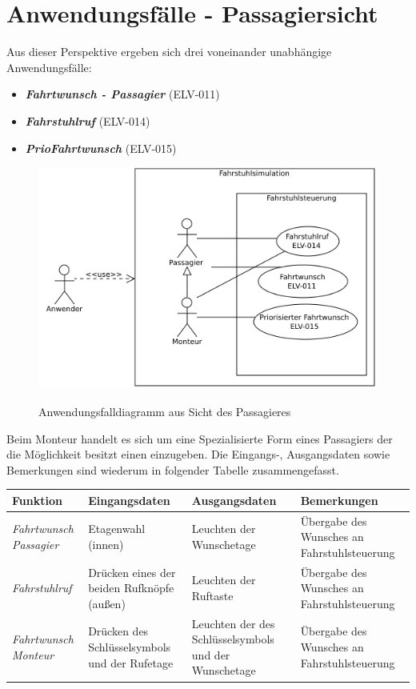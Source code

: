 \section{Anwendungsfälle - Passagiersicht}
Aus dieser Perspektive ergeben sich drei voneinander unabhängige Anwendungsfälle:

\begin{itemize}
	\item \textit{\textbf{\gls{Fahrtwunsch} - Passagier}} (ELV-011)
	\item \textit{\textbf{\gls{Fahrstuhlruf} }} (ELV-014)
	\item \textit{\textbf{\gls{PrioFahrtwunsch}}} (ELV-015)
\end{itemize}


\begin{figure}[hbt]
	\includegraphics[width=\textwidth]{images/passagierAWF.png}
	\label{fig:passagierAWF}
	\caption{Anwendungsfalldiagramm aus Sicht des Passagieres}
\end{figure}
Beim \gls{Monteur} handelt es sich um eine Spezialisierte Form eines \gls{Passagier}s der die Möglichkeit besitzt einen  einzugeben. Die Eingangs-, Ausgangsdaten sowie Bemerkungen sind wiederum in folgender Tabelle zusammengefasst.

 {
\vspace{1cm}
\hspace{-0,5cm}
\footnotesize
\begin{tabular}{|p{2cm}|p{3cm}|p{3cm}|p{3cm}|}
	\hline
		\textbf{Funktion} &
		\textbf{Eingangsdaten} &
		\textbf{Ausgangsdaten} &
		\textbf{Bemerkungen} \\
	\hline \hline
		\textit{Fahrtwunsch \newline Passagier} &
		Etagenwahl (innen) &
		Leuchten der Wunschetage &
		Übergabe des Wunsches an Fahrstuhlsteuerung \\
	\hline
		\textit{Fahrstuhlruf} &
		Drücken eines der beiden Rufknöpfe (außen) &
		Leuchten der Ruftaste &
		Übergabe des Wunsches an Fahrstuhlsteuerung  \\
	\hline
		\textit{Fahrtwunsch \newline Monteur} &
		Drücken des Schlüsselsymbols und der Rufetage &
		Leuchten der des Schlüsselsymbols und der Wunschetage &
		Übergabe des Wunsches an Fahrstuhlsteuerung  \\
	\hline
\end{tabular}
}

